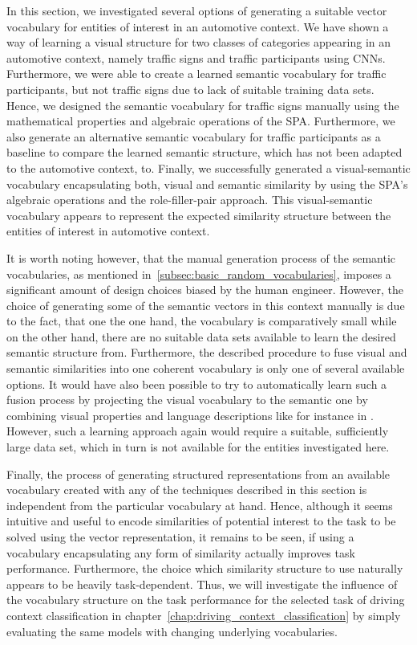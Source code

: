 In this section, we investigated several options of generating a suitable vector vocabulary for entities of interest in an automotive context.
We have shown a way of learning a visual structure for two classes of categories appearing in an automotive context, namely traffic signs and traffic participants using \acp{CNN}.
Furthermore, we were able to create a learned semantic vocabulary for traffic participants, but not traffic signs due to lack of suitable training data sets.
Hence, we designed the semantic vocabulary for traffic signs manually using the mathematical properties and algebraic operations of the \ac{SPA}.
Furthermore, we also generate an alternative semantic vocabulary for traffic participants as a baseline to compare the learned semantic structure, which has not been adapted to the automotive context, to.
Finally, we successfully generated a visual-semantic vocabulary encapsulating both, visual and semantic similarity by using the \ac{SPA}'s algebraic operations and the role-filler-pair approach.
This visual-semantic vocabulary appears to represent the expected similarity structure between the entities of interest in automotive context.

It is worth noting however, that the manual generation process of the semantic vocabularies, as mentioned in~\ref{subsec:basic_random_vocabularies}, imposes a significant amount of design choices biased by the human engineer.
However, the choice of generating some of the semantic vectors in this context manually is due to the fact, that one the one hand, the vocabulary is comparatively small while on the other hand, there are no suitable data sets available to learn the desired semantic structure from.
Furthermore, the described procedure to fuse visual and semantic similarities into one coherent vocabulary is only one of several available options.
It would have also been possible to try to automatically learn such a fusion process by projecting the visual vocabulary to the semantic one by combining visual properties and language descriptions like for instance in \textcite{Karpathy2017}.
However, such a learning approach again would require a suitable, sufficiently large data set, which in turn is not available for the entities investigated here.

Finally, the process of generating structured representations from an available vocabulary created with any of the techniques described in this section is independent from the particular vocabulary at hand.
Hence, although it seems intuitive and useful to encode similarities of potential interest to the task to be solved using the vector representation, it remains to be seen, if using a vocabulary encapsulating any form of similarity actually improves task performance.
Furthermore, the choice which similarity structure to use naturally appears to be heavily task-dependent.
Thus, we will investigate the influence of the vocabulary structure on the task performance for the selected task of driving context classification in chapter~\ref{chap:driving_context_classification} by simply evaluating the same models with changing underlying vocabularies.

